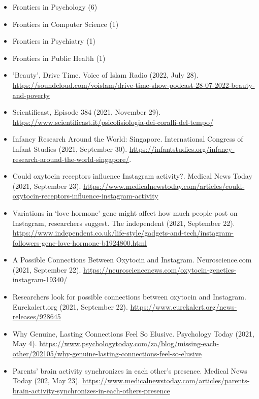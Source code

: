 \documentclass[10pt,a4paper]{altacv}
\begin{document}
\begin{fullwidth}
		\begin{itemize}
			\item Frontiers in Psychology (6)
			\item Frontiers in Computer Science (1)
			\item Frontiers in Psychiatry (1)
			\item Frontiers in Public Health (1)
			
		\end{itemize}
	
		
		\begin{itemize}
			\item 'Beauty', Drive Time. Voice of Islam Radio (2022, July 28). \url{https://soundcloud.com/voislam/drive-time-show-podcast-28-07-2022-beauty-and-poverty}
			\item Scientificast, Episode 384 (2021, November 29). \url{https://www.scientificast.it/psicofisiologia-dei-coralli-del-tempo/}
			\item Infancy Research Around the World: Singapore. International Congress of Infant Studies (2021, September 30). \url{https://infantstudies.org/infancy-research-around-the-world-singapore/}.
			\item Could oxytocin receptors influence Instagram activity?. Medical News Today (2021, September 23). \url{https://www.medicalnewstoday.com/articles/could-oxytocin-receptors-influence-instagram-activity}
			\item Variations in ‘love hormone’ gene might affect how much people post on Instagram, researchers suggest. The independent (2021, September 22). \url{https://www.independent.co.uk/life-style/gadgets-and-tech/instagram-followers-gene-love-hormone-b1924800.html}
			\item A Possible Connections Between Oxytocin and Instagram. Neuroscience.com (2021, September 22). \url{https://neurosciencenews.com/oxytocin-genetics-instagram-19340/}
			\item Researchers look for possible connections between oxytocin and Instagram. Eurekalert.org (2021, September 22). \url{https://www.eurekalert.org/news-releases/928645}
			\item Why Genuine, Lasting Connections Feel So Elusive. Psychology Today (2021, May 4). \url{https://www.psychologytoday.com/za/blog/missing-each-other/202105/why-genuine-lasting-connections-feel-so-elusive}
			\item Parents’ brain activity synchronizes in each other’s presence. Medical News Today (202, May 23). \url{https://www.medicalnewstoday.com/articles/parents-brain-activity-synchronizes-in-each-others-presence}

\end{itemize}
\end{fullwidth}
\end{document}
